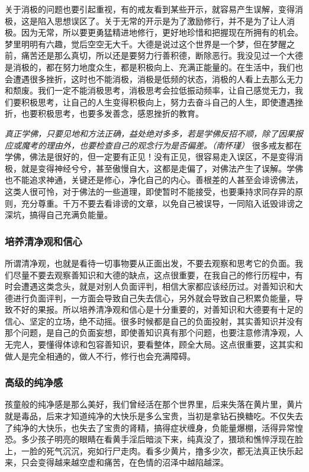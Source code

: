 关于消极的问题也要引起重视，有的戒友看到某些开示，就容易产生误解，变得消极，这是陷入思想误区了。关于无常的开示是为了激励修行，并不是为了让人消极。因为无常，所以要更勇猛精进地修行，更好地珍惜和把握现在所拥有的机会。梦里明明有六趣，觉后空空无大千。大德是说过这个世界是一个梦，但在梦醒之前，痛苦还是那么真切，所以还是要努力行善积德，断除恶行。我没见过一个大德是消极的，都在努力地度众生，都是积极向上、充满正能量的。在生活中，我们也会遭遇很多挫折，这时也不能消极，消极是低频的状态，消极的人看上去那么无力和颓废。我们一定不能消极思考，消极思考会拉低振动频率，让自己感觉无力，我们要积极思考，让自己的人生变得积极向上，努力去奋斗自己的人生，即使遭遇挫折，也要积极思考，也要多发善念，感恩挫折的教育。

\textit{真正学佛，只要见地和方法正确，益处绝对多多，若是学佛反招不顺，除了因果报应或魔考的理由外，也要检查自己的观念行为是否偏差。（南怀瑾）} 很多戒友都在学佛，佛法是很好的，但一定要有正见！没有正见，很容易走入误区，不是变得消极，就是变得神经兮兮，甚至傲慢自大，这都是走偏了，对佛法产生了误解。学佛也不能追求神通，关键还是修心，净化自己的内心。善根差的人甚至会诽谤佛法，这类人很可怜，对于佛法的一些道理，即使暂时不能接受，也要秉持求同存异的原则，充分尊重。千万不要去看诽谤的文章，以免自己被误导，一同陷入诋毁诽谤之深坑，搞得自己充满负能量。

\subsubsection{培养清净观和信心}

所谓清净观，也就是看待一切事物要从正面出发，不要去观察和思考它的负面。我们尽量不要去观察善知识和大德的缺点，这点很重要，在我自己的修行历程中，有时会遭遇这类念头，就是对别人负面评判，相信大家都应该经历过。对善知识和大德进行负面评判，一方面会导致自己失去信心，另外就会导致自己积累负能量，导致不好的果报。所以培养清净观和信心是十分重要的，对善知识和大德要有十足的信心、坚定的立场，绝不动摇。很多时候都是自己的负面投射，其实善知识并没有那个问题，是自己的负面妄想，即使善知识真有那个问题，也要注意修清净观，人无完人，要懂得体谅和包容善知识，要看整体，顾全大局。这点很重要，这其实和做人是完全相通的，做人不行，修行也会充满障碍。

\subsubsection{高级的纯净感}

孩童般的纯净感是那么美好，我们曾经活在那个世界里，后来失落在黄片里，黄片就是毒品，后来才知道纯净的大快乐是多么宝贵，当初是拿钻石换糖吃。不仅失去了纯净的大快乐，也失去了宝贵的肾精，搞得症状缠身，负能量爆棚，活得异常惶恐。多少孩子明亮的眼睛在看黄手淫后暗淡下来，纯真没了，猥琐和憔悴浮现在脸上，一脸的死气沉沉，宛如行尸走肉。看多少黄片，撸多少次，都无法真正快乐起来，只会变得越来越空虚和痛苦，在色情的沼泽中越陷越深。

